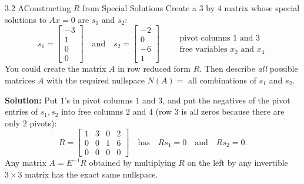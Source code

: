 \documentclass[11pt,a4paper,openany,oneside]{book}
\def\vect#1{#1}%
\def\mathbf#1{#1}%
\newcommand{\vect}[1]{\mathbf{#1}}
\numberwithin{equation}{chapter}
\begin{document}
\begin{example}{3.2 A}{Constructing $R$ from Special Solutions}
Create a $3$ by $4$ matrix whose special solutions to $A\vect{x} = \vect{0}$ are $\vect{s}_1$ and $\vect{s}_2$:
\[
\vect{s}_1 = \begin{bmatrix} -3 \\ 1 \\ 0 \\ 0 \end{bmatrix} \quad \text{and} \quad \vect{s}_2 = \begin{bmatrix} -2 \\ 0 \\ -6 \\ 1 \end{bmatrix} \qquad \begin{array}{l} \text{pivot columns } 1 \text{ and } 3 \\ \text{free variables } x_2 \text{ and } x_4 \end{array}
\]
You could create the matrix $A$ in row reduced form $R$. Then describe \emph{all} possible matrices $A$ with the required nullspace $N(A) =$ all combinations of $\vect{s}_1$ and $\vect{s}_2$.
\end{example}
\textbf{Solution:} Put $1$'s in pivot columns $1$ and $3$, and put the negatives of the pivot entries of $\vect{s}_1, \vect{s}_2$ into free columns $2$ and $4$ (row 3 is all zeros because there are only 2 pivots):
\[
R = \begin{bmatrix} 1 & 3 & 0 & 2 \\ 0 & 0 & 1 & 6 \\ 0 & 0 & 0 & 0 \end{bmatrix} \quad \text{has} \quad R\vect{s}_1 = \vect{0} \quad \text{and} \quad R\vect{s}_2 = \vect{0}.
\]
Any matrix $A = E^{-1}R$ obtained by multiplying $R$ on the left by any invertible $3\times 3$ matrix has the exact same nullspace.
\end{document}
